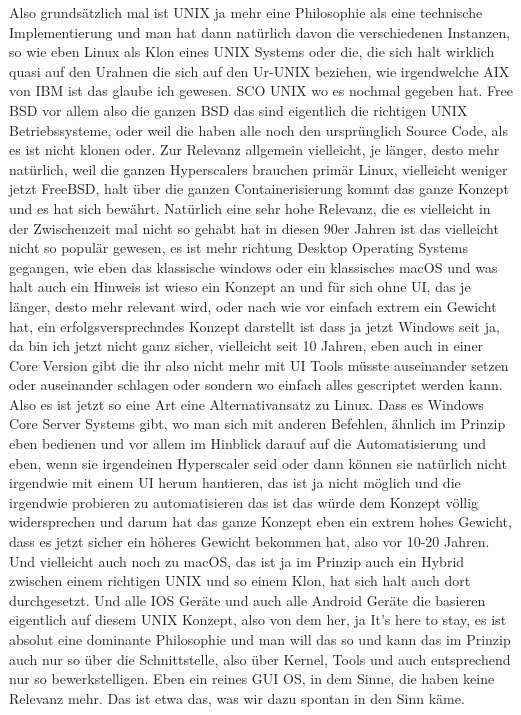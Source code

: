 \begin{description}
\NH Also grundsätzlich mal ist UNIX ja mehr eine Philosophie als eine technische Implementierung und man hat dann natürlich davon die verschiedenen Instanzen, so wie eben Linux als Klon eines UNIX Systems oder die, die sich halt wirklich quasi auf den Urahnen die sich auf den Ur-UNIX beziehen, wie irgendwelche AIX von IBM ist das glaube ich gewesen. SCO UNIX wo es nochmal gegeben hat. Free BSD vor allem also die ganzen BSD das sind eigentlich die richtigen UNIX Betriebssysteme, oder weil die haben alle noch den ursprünglich Source Code, als es ist nicht klonen oder. Zur Relevanz allgemein vielleicht, je länger, desto mehr natürlich, weil die ganzen Hyperscalers brauchen primär Linux, vielleicht weniger jetzt FreeBSD, halt über die ganzen Containerisierung kommt das ganze Konzept und es hat sich bewährt. Natürlich eine sehr hohe Relevanz, die es vielleicht in der Zwischenzeit mal nicht so gehabt hat in diesen 90er Jahren ist das vielleicht nicht so populär gewesen, es ist mehr richtung Desktop Operating Systems gegangen, wie eben das klassische windows oder ein klassisches macOS und was halt auch ein Hinweis ist wieso ein Konzept an und für sich ohne UI, das je länger, desto mehr relevant wird, oder nach wie vor einfach extrem ein Gewicht hat, ein erfolgsversprechndes Konzept darstellt ist dass ja jetzt Windows seit ja, da bin ich jetzt nicht ganz sicher, vielleicht seit 10 Jahren, eben auch in einer Core Version gibt die ihr also nicht mehr mit UI Tools müsste auseinander setzen oder auseinander schlagen oder sondern wo einfach alles gescriptet werden kann. Also es ist jetzt so eine Art eine Alternativansatz zu Linux. Dass es Windows Core Server Systems gibt, wo man sich mit anderen Befehlen, ähnlich im Prinzip eben bedienen und vor allem im Hinblick darauf auf die Automatisierung und eben, wenn sie irgendeinen Hyperscaler seid oder dann können sie natürlich nicht irgendwie mit einem UI herum hantieren, das ist ja nicht möglich und die irgendwie probieren zu automatisieren das ist das würde dem Konzept völlig widersprechen und darum hat das ganze Konzept eben ein extrem hohes Gewicht, dass es jetzt sicher ein höheres Gewicht bekommen hat, also vor 10-20 Jahren. Und vielleicht auch noch zu macOS, das ist ja im Prinzip auch ein Hybrid zwischen einem richtigen UNIX und so einem Klon, hat sich halt auch dort durchgesetzt. Und alle IOS Geräte und auch alle Android Geräte die basieren eigentlich auf diesem UNIX Konzept, also von dem her, ja \glqq It's here to stay\grqq, es ist absolut eine dominante Philosophie und man will das so und kann das im Prinzip auch nur so über die Schnittstelle, also über Kernel, Tools und auch entsprechend nur so bewerkstelligen. Eben ein reines GUI OS, in dem Sinne, die haben keine Relevanz mehr. Das ist etwa das, was wir dazu spontan in den Sinn käme.
	

\end{description}
